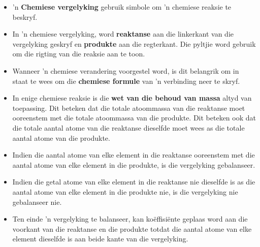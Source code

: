 
            \nopagebreak
      \label{m38727*id67171}\begin{itemize}[noitemsep]
            \label{m38727*uid36}\item 'n \textbf{Chemiese vergelyking} gebruik simbole om 'n chemiese reaksie te beskryf.
\label{m38727*uid37}\item In 'n chemiese vergelyking, word \textbf{reaktanse} aan die linkerkant van die vergelyking geskryf en \textbf{produkte} aan die regterkant. Die pyltjie word gebruik om die rigting van die reaksie aan te toon.
\label{m38727*uid38}\item Wanneer  'n chemiese verandering voorgestel word, is dit belangrik om in staat te wees om die \textbf{chemiese formule} van  'n verbinding neer te skryf.
\label{m38727*uid39}\item In enige chemiese reaksie is die \textbf{wet van die behoud van massa} altyd van toepassing. Dit beteken dat die totale atoommassa van die reaktanse moet ooreenstem met die totale atoommassa van die produkte. Dit beteken ook dat die totale aantal atome van die reaktanse dieselfde moet wees as die totale aantal atome van die produkte.
\label{m38727*uid41}\item Indien die aantal atome van elke element in die reaktanse ooreenstem met die aantal atome van elke element in die produkte, is die vergelyking gebalanseer.
\label{m38727*uid42}\item Indien die getal atome van elke element in die reaktanse nie dieselfde is as die aantal atome van elke element in die produkte nie, is die vergelyking nie gebalanseer nie.
\item Ten einde 'n vergelyking te balanseer,  kan koëffisiënte geplaas word aan die voorkant van die reaktanse en die  produkte totdat die aantal atome van elke element dieselfde is aan beide kante van die vergelyking.
\end{itemize}


